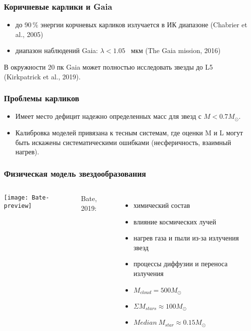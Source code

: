 \begin{frame}
\frametitle{Коричневые карлики и Gaia}
\begin{itemize}
  \item до 90\,\% энергии корчневых карликов излучается в ИК диапазоне (Chabrier et al., 2005)
  \item диапазон наблюдений Gaia: $\lambda <1.05$~ мкм (The Gaia mission, 2016)
\end{itemize}

В окружности 20 пк Gaia может полностью исследовать звезды до L5 (Kirkpatrick et al., 2019).
\end{frame}

\begin{frame}%
\frametitle{Проблемы карликов}
\begin{itemize}
\item Имеет место дефицит надежно определенных масс для звезд с $M<0.7 M_{\odot}$.
\item Калибровка моделей привязана к тесным системам, где оценки M и L могут быть искажены систематическими ошибками (несферичность, взаимный нагрев).
\end{itemize}
\end{frame}

\begin{frame}%
\frametitle{Физическая модель звездообразования}
\begin{columns}
	\texttt{[image: Bate-preview]}

 {\footnotesize Bate, 2019: \\
 \begin{itemize}
    \item химический состав
    \item влияние космических лучей
    \item нагрев газа и пыли из-за излучения звезд
    \item процессы диффузии и переноса излучения
    \item $M_{cloud}=500M_{\odot}$
    \item $\Sigma M_{stars} \approx 100M_\odot$
    \item $Median~M_{star} \approx 0.15M_\odot$
 \end{itemize}
 }
\end{columns}
\end{frame}

